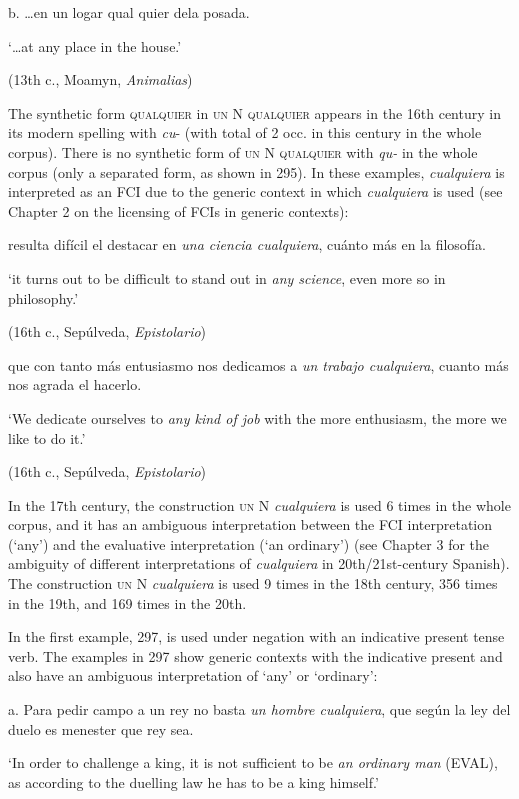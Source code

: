   b.  …en un logar qual quier dela posada. 

    ‘…at any place in the house.’

    (13th c., Moamyn, \textit{Animalias})

The synthetic form \textsc{qualquier} in \textsc{un} N \textsc{qualquier} appears in the 16th century in its modern spelling with \textit{cu}{}- (with total of 2 occ. in this century in the whole corpus). There is no synthetic form of \textsc{un} N \textsc{qualquier} with \textit{qu-} in the whole corpus (only a separated form, as shown in 295). In these examples, \textit{cualquiera} is interpreted as an FCI due to the generic context in which \textit{cualquiera} is used (see Chapter 2 on the licensing of FCIs in generic contexts):

  resulta difícil el destacar en \textit{una ciencia cualquiera}, cuánto más en la filosofía. 

  ‘it turns out to be difficult to stand out in \textit{any science}, even more so in philosophy.’

  (16th c., Sepúlveda, \textit{Epistolario})

  que con tanto más entusiasmo nos dedicamos a \textit{un trabajo cualquiera}, cuanto más nos agrada el hacerlo. 

  ‘We dedicate ourselves to \textit{any kind of job} with the more enthusiasm, the more we like to do it.’

  (16th c., Sepúlveda, \textit{Epistolario})

In the 17th century, the construction \textsc{un} N \textit{cualquiera} is used 6 times in the whole corpus, and it has an ambiguous interpretation between the FCI interpretation (‘any’) and the evaluative interpretation (‘an ordinary’) (see Chapter 3 for the ambiguity of different interpretations of \textit{cualquiera} in 20th/21st-century Spanish). The construction \textsc{un} N \textit{cualquiera} is used 9 times in the 18th century, 356 times in the 19th, and 169 times in the 20th.

  In the first example, 297, is used under negation with an indicative present tense verb. The examples in 297 show generic contexts with the indicative present and also have an ambiguous interpretation of ‘any’ or ‘ordinary’:

  a.  Para pedir campo a un rey no basta \textit{un hombre cualquiera}, que según la ley del duelo es menester que rey sea. 

    ‘In order to challenge a king, it is not sufficient to be \textit{an ordinary man} (EVAL), as according to the duelling law he has to be a king himself.’

